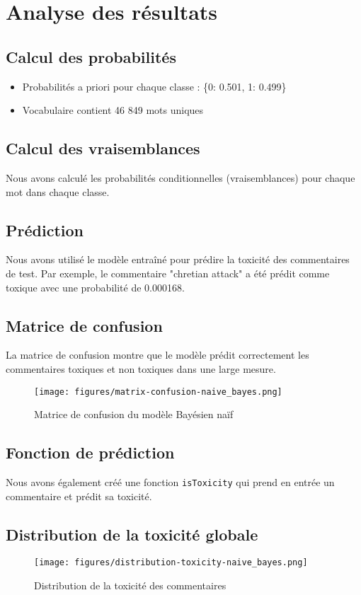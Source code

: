 \section{Analyse des résultats}

\subsection{Calcul des probabilités}

\begin{itemize}
    \item Probabilités a priori pour chaque classe : \{0: 0.501, 1: 0.499\}
    \item Vocabulaire contient 46 849 mots uniques
\end{itemize}

\subsection{Calcul des vraisemblances}

Nous avons calculé les probabilités conditionnelles (vraisemblances) pour chaque mot dans chaque classe.

\subsection{Prédiction}

Nous avons utilisé le modèle entraîné pour prédire la toxicité des commentaires de test. Par exemple, le commentaire "chretian attack" a été prédit comme toxique avec une probabilité de 0.000168.

\subsection{Matrice de confusion}

La matrice de confusion montre que le modèle prédit correctement les commentaires toxiques et non toxiques dans une large mesure.

\begin{figure}[h]
    \centering
    \texttt{[image: figures/matrix-confusion-naive\_bayes.png]}
    \caption{Matrice de confusion du modèle Bayésien naïf}
\end{figure}

\subsection{Fonction de prédiction}

Nous avons également créé une fonction \texttt{isToxicity} qui prend en entrée un commentaire et prédit sa toxicité.

\subsection{Distribution de la toxicité globale}

\begin{figure}[h]
    \centering
    \texttt{[image: figures/distribution-toxicity-naive\_bayes.png]}
    \caption{Distribution de la toxicité des commentaires}
\end{figure}


